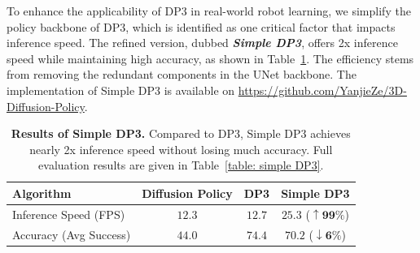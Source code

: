 \begin{appendix}
To enhance the applicability of DP3 in real-world robot learning, we simplify the policy backbone of DP3, which is identified as one critical factor that impacts inference speed. The refined version, dubbed \textbf{\textit{Simple DP3}}, offers 2x inference speed while maintaining high accuracy, as shown in Table~\ref{tab:summary simple DP3}. The efficiency stems from removing the redundant components in the UNet backbone. The implementation of Simple DP3 is available on \url{https://github.com/YanjieZe/3D-Diffusion-Policy}.



\begin{table}[htbp]
    \centering
     \caption{\textbf{Results of Simple DP3.} Compared to DP3, Simple DP3 achieves nearly 2x inference speed without losing much accuracy. Full evaluation results are given in Table~\ref{table: simple DP3}.}
    \label{tab:summary simple DP3}
    \vspace{-0.05in}
    \begin{tabular}{l|ccc}
    \toprule
         Algorithm & Diffusion Policy & DP3  & \textbf{Simple DP3} \\
         \midrule
        Inference Speed (FPS) & $12.3$ & $12.7$ & $25.3$ ($\uparrow \mathbf{99}\%$) \\
        Accuracy (Avg Success) & $44.0$ &  $74.4$ & $70.2$ ($\downarrow \mathbf{6}\%$) \\
        \bottomrule
    \end{tabular}

\end{table}







\end{appendix}


